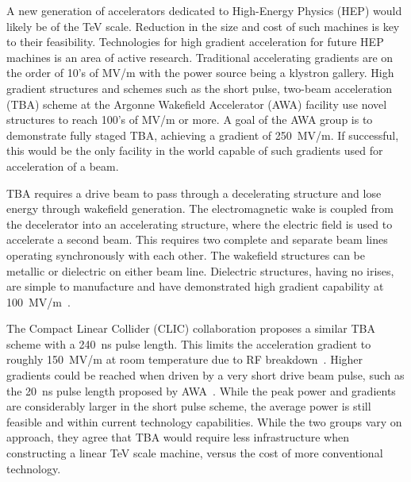  \label{sec:motivation}

A new generation of accelerators dedicated to High-Energy Physics
(HEP) would likely be of the TeV scale. Reduction in the size and cost
of such machines is key to their feasibility. 
Technologies for high gradient acceleration for future HEP machines is an area of active research.
Traditional accelerating gradients are on the order of 10's of MV/m
with the power source being a klystron gallery.
High gradient structures and schemes such as the 
short pulse, two-beam acceleration (TBA) scheme 
at the Argonne Wakefield Accelerator (AWA) facility
use novel structures to reach 100's of MV/m or more. 
A goal of the AWA group is to demonstrate fully staged TBA, 
achieving a gradient of \SI{250}{MV/m}. If successful, this would
be the only facility in the world capable of such gradients used for
acceleration of a beam.

TBA requires a drive beam to pass through a decelerating structure and
lose energy through wakefield generation. The electromagnetic wake
is coupled from the decelerator into an accelerating structure, where
the electric field is used to accelerate a second beam. 
This requires two complete and separate beam lines 
operating synchronously with each other.  
The wakefield structures can be metallic or dielectric on either beam line. 
Dielectric structures, having no irises, are simple to manufacture and have demonstrated
high gradient capability at \SI{100}{MV/m}~\cite{WeiPaper}. 

The Compact Linear Collider (CLIC) collaboration proposes a similar TBA scheme with
a \SI{240}{ns} pulse length. This limits the acceleration gradient
to roughly \SI{150}{MV/m} at room temperature due to RF breakdown~\cite{CLICdesignReport}.
Higher gradients could be reached when driven by a very short drive
beam pulse, such as the \SI{20}{ns} pulse length proposed by AWA~\cite{WeiPaper}. 
While the peak power and gradients are considerably larger in the short pulse scheme, 
the average power is still feasible and within current technology capabilities.
While the two groups vary on approach, they agree that TBA would 
require less infrastructure when constructing a linear TeV scale machine, 
versus the cost of more conventional technology. 

